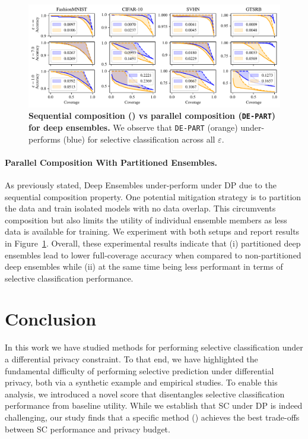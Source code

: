 \begin{figure}[b]
  \centering
  \includegraphics[width=\linewidth]{figs/sptd_dp/cov_acc_de_bound}
\caption[Sequential composition (\de) vs parallel composition (\texttt{DE-PART}) for deep ensembles.]{\textbf{Sequential composition (\de) vs parallel composition (\texttt{DE-PART}) for deep ensembles.} We observe that \texttt{DE-PART} (orange) under-performs \de (blue) for selective classification across all $\varepsilon$.}
\label{fig:acc_cov_bound_de}
\end{figure}

\paragraph{Parallel Composition With Partitioned Ensembles.}

As previously stated, Deep Ensembles under-perform under DP due to the sequential composition property. One potential mitigation strategy is to partition the data and train isolated models with no data overlap. This circumvents composition but also limits the utility of individual ensemble members as less data is available for training. We experiment with both setups and report results in Figure~\ref{fig:acc_cov_bound_de}. Overall, these experimental results indicate that (i) partitioned deep ensembles lead to lower full-coverage accuracy when compared to non-partitioned deep ensembles while (ii) at the same time being less performant in terms of selective classification performance.

\section{Conclusion}
\label{sec:concl}

In this work we have studied methods for performing selective classification under a differential privacy constraint. To that end, we have highlighted the fundamental difficulty of performing selective prediction under differential privacy, both via a synthetic example and empirical studies. To enable this analysis, we introduced a novel score that disentangles selective classification performance from baseline utility. While we establish that SC under DP is indeed challenging, our study finds that a specific method (\sctd) achieves the best trade-offs between SC performance and privacy budget.

